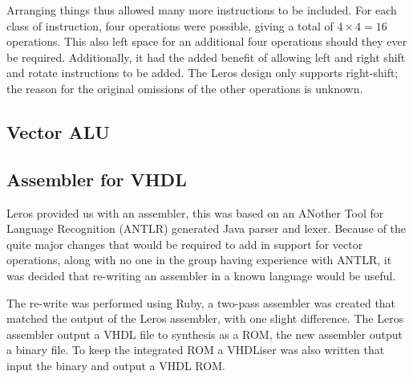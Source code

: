 Arranging things thus allowed many more instructions to be included. For each
class of instruction, four operations were possible, giving a total of $4 \times
4 = 16$ operations. This also left space for an additional four operations
should they ever be required. Additionally, it  had the added benefit of
allowing left and right shift and rotate instructions to be added. The Leros
design only supports right-shift; the reason for the original omissions of the other
operations is unknown.



\subsection{Vector ALU}
\subsection{Assembler for VHDL}

  Leros provided us with an assembler, this was based on an ANother Tool for
  Language Recognition (ANTLR) generated Java parser and lexer.  Because of the
  quite major changes that would be required to add in support for vector
  operations, along with no one in the group having experience with ANTLR, it
  was decided that re-writing an assembler in a known language would be useful.

  The re-write was performed using Ruby, a two-pass assembler was created that
  matched the output of the Leros assembler, with one slight difference.  The
  Leros assembler output a VHDL file to synthesis as a ROM, the new assembler
  output a binary file.  To keep the integrated ROM a VHDLiser was also written
  that input the binary and output a VHDL ROM.
